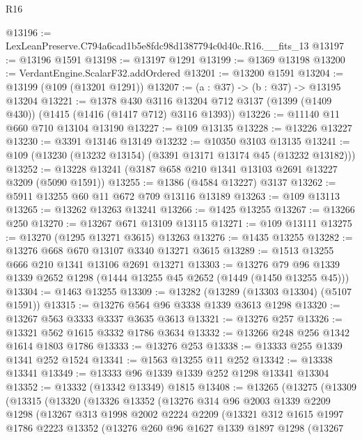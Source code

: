 \begin{lexlean}{R16}
\begin{coremodule}
@13196 := LexLeanPreserve.C794a6cad1b5e8fdc98d1387794c0d40c.R16.__fits_13
@13197 := @13196 @1591
@13198 := @13197 @1291
@13199 := @1369 @13198
@13200 := VerdantEngine.ScalarF32.addOrdered
@13201 := @13200 @1591
@13204 := @13199 (@109 (@13201 @1291))
@13207 := (a : @37) -> (b : @37) -> @13195 @13204
@13221 := @1378
    @430
    @3116
    @13204
    @712
    @3137
    (@1399 (@1409 @430))
    (@1415 (@1416 (@1417 @712) @3116 @1393))
@13226 := @11140 @11 @660 @710 @13104 @13190
@13227 := @109 @13135
@13228 := @13226 @13227
@13230 := @3391 @13146 @13149
@13232 := @10350 @3103 @13135
@13241 := @109 (@13230 (@13232 @13154) (@3391 @13171 @13174 @45 (@13232 @13182)))
@13252 := @13228 @13241 (@3187 @658 @210 @1341 @13103 @2691 @13227 @3209 (@5090 @1591))
@13255 := @1386 (@4584 @13227) @3137
@13262 := @5911 @13255 @60 @11 @672 @709 @13116 @13189
@13263 := @109 @13113
@13265 := @13262 @13263 @13241
@13266 := @1425 @13255
@13267 := @13266 @250
@13270 := @13267 @671 @13109 @13115
@13271 := @109 @13111
@13275 := @13270 (@1295 @13271 @3615) @13263
@13276 := @1435 @13255
@13282 := @13276 @668 @670 @13107 @3340 @13271 @3615
@13289 := @1513 @13255 @666 @210 @1341 @13106 @2691 @13271
@13303 := @13276 @79 @96 @1339 @1339 @2652 @1298 (@1444 @13255 @45 @2652 (@1449 (@1450 @13255 @45)))
@13304 := @1463 @13255
@13309 := @13282 (@13289 (@13303 @13304) (@5107 @1591))
@13315 := @13276 @564 @96 @3338 @1339 @3613 @1298
@13320 := @13267 @563 @3333 @3337 @3635 @3613
@13321 := @13276 @257
@13326 := @13321 @562 @1615 @3332 @1786 @3634
@13332 := @13266 @248 @256 @1342 @1614 @1803 @1786
@13333 := @13276 @253
@13338 := @13333 @255 @1339 @1341 @252 @1524
@13341 := @1563 @13255 @11 @252
@13342 := @13338 @13341
@13349 := @13333 @96 @1339 @1339 @252 @1298 @13341 @13304
@13352 := @13332 (@13342 @13349) @1815
@13408 := @13265
    (@13275
      (@13309
        (@13315
          (@13320
            (@13326
              @13352
              (@13276
                @314
                @96
                @2003
                @1339
                @2209
                @1298
                (@13267
                  @313
                  @1998
                  @2002
                  @2224
                  @2209
                  (@13321
                    @312
                    @1615
                    @1997
                    @1786
                    @2223
                    @13352
                    (@13276
                      @260
                      @96
                      @1627
                      @1339
                      @1897
                      @1298
                      (@13267

\end{coremodule}
\end{lexlean}
